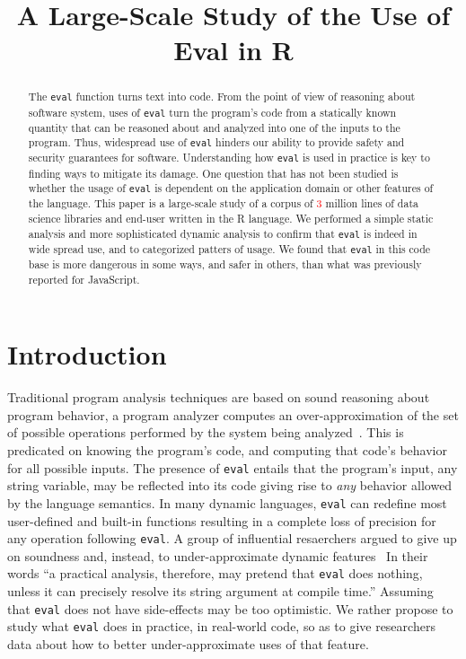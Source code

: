 \documentclass[conference]{IEEEtran}
\begin{document}
\title{A Large-Scale Study of the Use of Eval in R}
\author{\vspace{-.8cm}%
}  
\maketitle

\newcommand{\eval}{\texttt{eval}\xspace}
\renewcommand{\c}[1]{\lstinline{#1}\xspace}
\newcommand{\miss}[1]{{\textcolor{red}{#1}}\xspace}

\begin{abstract}
  The \eval function turns text into code. From the point of view of
  reasoning about software system, uses of \eval turn the program's code
  from a statically known quantity that can be reasoned about and analyzed
  into one of the inputs to the program. Thus, widespread use of \eval
  hinders our ability to provide safety and security guarantees for
  software. Understanding how \eval is used in practice is key to finding
  ways to mitigate its damage. One question that has not been studied is
  whether the usage of \eval is dependent on the application domain or other
  features of the language. This paper is a large-scale study of a corpus of
  \miss{3} million lines of data science libraries and end-user written in
  the R language. We performed a simple static analysis and more
  sophisticated dynamic analysis to confirm that \eval is indeed in wide
  spread use, and to categorized patters of usage. We found that \eval in
  this code base is more dangerous in some ways, and safer in others, than
  what was previously reported for JavaScript.
\end{abstract}

\section{Introduction}

Traditional program analysis techniques are based on sound reasoning about
program behavior, a program analyzer computes an over-approximation of the
set of possible operations performed by the system being
analyzed~\cite{cc77}.  This is predicated on knowing the program's code, and
computing that code's behavior for all possible inputs. The presence of
\eval entails that the program's input, any string variable, may be
reflected into its code giving rise to \emph{any} behavior allowed by the
language semantics. In many dynamic languages, \eval can redefine most
user-defined and built-in functions resulting in a complete loss of
precision for any operation following \eval. A group of influential
resaerchers argued to give up on soundness and, instead, to
under-approximate dynamic features~\cite{soundy} In their words ``a
practical analysis, therefore, may pretend that \eval does nothing, unless
it can precisely resolve its string argument at compile time.''  Assuming
that \eval does not have side-effects may be too optimistic. We rather
propose to study what \eval does in practice, in real-world code, so as to
give researchers data about how to better under-approximate uses of that
feature.
\end{document}
